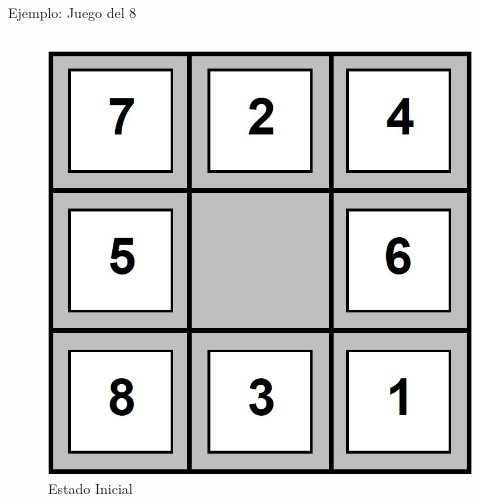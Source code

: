 \documentclass{beamer}
\theoremstyle{definition}
\theoremstyle{theorem}
\theoremstyle{remark}
\begin{document}
\begin{frame}{Ejemplo: Juego del 8}
    \begin{columns}
        \begin{column}{0.5\textwidth}       
            \begin{figure}[h!]
                \includegraphics[scale=.15]{21_grid1.JPG}
                \\
                \vspace{0pt}
                {\tiny Estado Inicial}
            \end{figure}
        \end{column}
                

\end{columns}
\end{frame}
\end{document}
